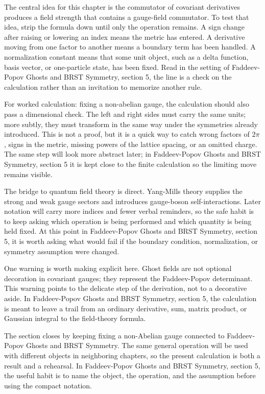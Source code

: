 The central idea for this chapter is the commutator of covariant derivatives produces a field strength that contains a gauge-field commutator.  To test that idea, strip the formula down until only the operation remains.  A sign change after raising or lowering an index means the metric has entered.  A derivative moving from one factor to another means a boundary term has been handled.  A normalization constant means that some unit object, such as a delta function, basis vector, or one-particle state, has been fixed.  Read in the setting of Faddeev-Popov Ghosts and BRST Symmetry, section 5, the line is a check on the calculation rather than an invitation to memorize another rule.

For worked calculation: fixing a non-abelian gauge, the calculation should also pass a dimensional check.  The left and right sides must carry the same units; more subtly, they must transform in the same way under the symmetries already introduced.  This is not a proof, but it is a quick way to catch wrong factors of \(2\pi\), signs in the metric, missing powers of the lattice spacing, or an omitted charge.  The same step will look more abstract later; in Faddeev-Popov Ghosts and BRST Symmetry, section 5 it is kept close to the finite calculation so the limiting move remains visible.

The bridge to quantum field theory is direct.  Yang-Mills theory supplies the strong and weak gauge sectors and introduces gauge-boson self-interactions.  Later notation will carry more indices and fewer verbal reminders, so the safe habit is to keep asking which operation is being performed and which quantity is being held fixed.  At this point in Faddeev-Popov Ghosts and BRST Symmetry, section 5, it is worth asking what would fail if the boundary condition, normalization, or symmetry assumption were changed.

One warning is worth making explicit here.  Ghost fields are not optional decoration in covariant gauges; they represent the Faddeev-Popov determinant.  This warning points to the delicate step of the derivation, not to a decorative aside.  In Faddeev-Popov Ghosts and BRST Symmetry, section 5, the calculation is meant to leave a trail from an ordinary derivative, sum, matrix product, or Gaussian integral to the field-theory formula.

The section closes by keeping fixing a non-Abelian gauge connected to Faddeev-Popov Ghosts and BRST Symmetry.  The same general operation will be used with different objects in neighboring chapters, so the present calculation is both a result and a rehearsal.  In Faddeev-Popov Ghosts and BRST Symmetry, section 5, the useful habit is to name the object, the operation, and the assumption before using the compact notation.



